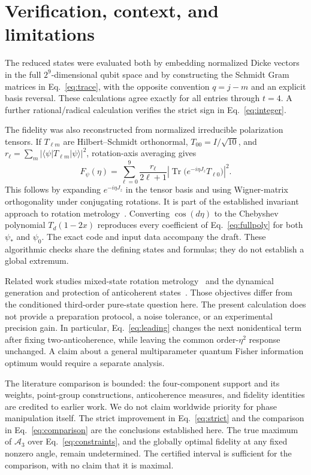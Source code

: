 \documentclass[aps,pra,reprint,onecolumn,notitlepage,longbibliography]{revtex4-2}
\newcommand{\ket}[1]{\lvert #1\rangle}
\newcommand{\bra}[1]{\langle #1\rvert}
\newcommand{\tr}{\operatorname{Tr}}
\newcommand{\A}{\mathcal A}
\begin{document}
\section{Verification, context, and limitations}
The reduced states were evaluated both by embedding normalized Dicke vectors in the full $2^9$-dimensional qubit space and by constructing the Schmidt Gram matrices in Eq.~\eqref{eq:trace}, with the opposite convention $q=j-m$ and an explicit basis reversal. These calculations agree exactly for all entries through $t=4$. A further rational/radical calculation verifies the strict sign in Eq.~\eqref{eq:integer}.

The fidelity was also reconstructed from normalized irreducible polarization tensors. If $T_{\ell m}$ are Hilbert--Schmidt orthonormal, $T_{00}=I/\sqrt{10}$, and $r_\ell=\sum_m|\bra\psi T_{\ell m}\ket\psi|^2$, rotation-axis averaging gives
\begin{equation}
 F_\psi(\eta)=\sum_{\ell=0}^9\frac{r_\ell}{2\ell+1}
     \left|\tr\bigl(e^{-i\eta J_z}T_{\ell0}\bigr)\right|^2.
 \label{eq:tensor}
\end{equation}
This follows by expanding $e^{-i\eta J_z}$ in the tensor basis and using Wigner-matrix orthogonality under conjugating rotations. It is part of the established invariant approach to rotation metrology~\cite{Aragon2026}. Converting $\cos(d\eta)$ to the Chebyshev polynomial $T_d(1-2x)$ reproduces every coefficient of Eq.~\eqref{eq:fullpoly} for both $\psi_*$ and $\psi_0$. The exact code and input data accompany the draft. These algorithmic checks share the defining states and formulas; they do not establish a global extremum.

Related work studies mixed-state rotation metrology~\cite{Serrano2025} and the dynamical generation and protection of anticoherent states~\cite{Denis2026}. Those objectives differ from the conditioned third-order pure-state question here. The present calculation does not provide a preparation protocol, a noise tolerance, or an experimental precision gain. In particular, Eq.~\eqref{eq:leading} changes the next nonidentical term after fixing two-anticoherence, while leaving the common order-$\eta^2$ response unchanged. A claim about a general multiparameter quantum Fisher information optimum would require a separate analysis.

The literature comparison is bounded: the four-component support and its weights, point-group constructions, anticoherence measures, and fidelity identities are credited to earlier work. We do not claim worldwide priority for phase manipulation itself. The strict improvement in Eq.~\eqref{eq:strict} and the comparison in Eq.~\eqref{eq:comparison} are the conclusions established here. The true maximum of $\A_3$ over Eq.~\eqref{eq:constraints}, and the globally optimal fidelity at any fixed nonzero angle, remain undetermined. The certified interval is sufficient for the comparison, with no claim that it is maximal.
\end{document}
